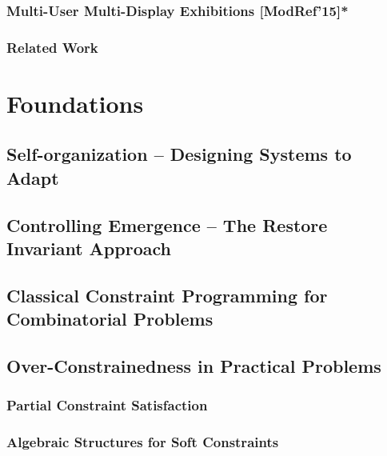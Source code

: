 \documentclass[10pt,a4paper]{book}
\begin{document}
\subsection{Multi-User Multi-Display Exhibitions [ModRef'15]*}
\subsection{Related Work}



\chapter{Foundations}
\section{Self-organization -- Designing Systems to Adapt}
\section{Controlling Emergence -- The Restore Invariant Approach}
\section{Classical Constraint Programming for Combinatorial Problems}
\section{Over-Constrainedness in Practical Problems}
\subsection{Partial Constraint Satisfaction}
\subsection{Algebraic Structures for Soft Constraints}
\end{document}

